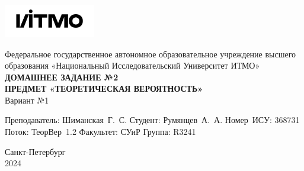 \documentclass[a4paper, 12pt]{article}
\begin{document}
    \begin{titlepage}

        \begin{center}
        \includegraphics[width=0.3\textwidth]{itmo.png} %
        \vfill

        Федеральное государственное автономное образовательное учреждение высшего образования
        «Национальный Исследовательский Университет ИТМО»\\

        \vfill
        {\large\bf ДОМАШНЕЕ ЗАДАНИЕ №2}\\
        {\large\bf ПРЕДМЕТ «ТЕОРЕТИЧЕСКАЯ ВЕРОЯТНОСТЬ»}\\
        Вариант №1
        \vfill

        \begin{flushright}
            \begin{minipage}{.45\textwidth}
            {
                \hbox{Преподаватель:}
                \hbox{Шиманская Г. С.}
                \hbox{Студент:}
                \hbox{Румянцев А. А.}
                \hbox{}
                \hbox{Номер ИСУ:}
                \hbox{368731}
                \hbox{Поток:}
                \hbox{ТеорВер 1.2}
                \hbox{Факультет:}
                \hbox{СУиР}
                \hbox{Группа:}
                \hbox{R3241}
            }
            \end{minipage}
        \end{flushright}

        \vfill

        Санкт-Петербург\\
        2024
        \end{center}
    \end{titlepage}

    \tableofcontents

    \newpage
\end{document}

